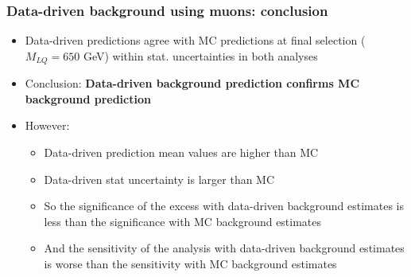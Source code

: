 \documentclass[bigger]{beamer}
\providecommand{\alert}[1]{\textbf{#1}}
\begin{document}
\begin{frame}
\frametitle{Data-driven background using muons: conclusion}
\label{sec-1-6-7}
\label{sec-1-6-7-1}

\ChangeItemFont{\footnotesize}{\footnotesize}{\footnotesize}
\begin{itemize}
\item Data-driven predictions agree with MC predictions at final selection ($M_{LQ} = 650$ GeV) within stat. uncertainties in both analyses
\item Conclusion: \alert{Data-driven background prediction confirms MC background prediction}
\item However:
\begin{itemize}
\item Data-driven prediction mean values are higher than MC
\item Data-driven stat uncertainty is larger than MC
\item So the significance of the excess with data-driven background estimates is less than the significance with MC background estimates
\item And the sensitivity of the analysis with data-driven background estimates is worse than the sensitivity with MC background estimates
\end{itemize}
\end{itemize}
\end{frame}
\end{document}
